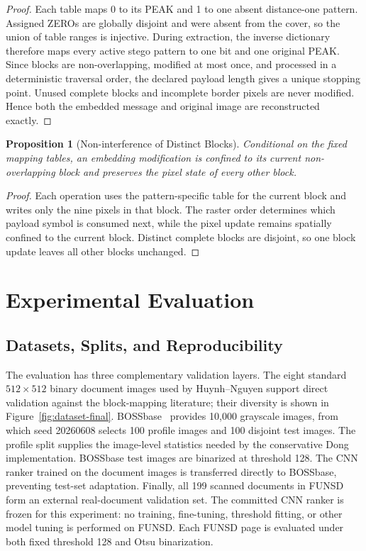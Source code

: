 \documentclass[a4paper,fleqn]{cas-dc}
\newtheorem{proposition}{Proposition}[section]
\newcommand{\RevisionAddBegin}{\begingroup}
\newcommand{\RevisionAddEnd}{\endgroup}
\newcommand{\RevisionAddBegin}{\begingroup\color{revisionblue}}
\newcommand{\RevisionAddEnd}{\endgroup}
\begin{document}
\begin{proof}
Each table maps 0 to its PEAK and 1 to one absent distance-one pattern.
Assigned ZEROs are globally disjoint and were absent from the cover, so the
union of table ranges is injective. During extraction, the inverse dictionary
therefore maps every active stego pattern to one bit and one original PEAK.
Since blocks are non-overlapping, modified at most once, and processed in a
deterministic traversal order, the declared payload length gives a unique
stopping point. Unused complete blocks and incomplete border pixels are never
modified. Hence both the embedded message and original image are reconstructed
exactly.
\end{proof}

\begin{proposition}[Non-interference of Distinct Blocks]
Conditional on the fixed mapping tables, an embedding modification is confined
to its current non-overlapping block and preserves the pixel state of every
other block.
\end{proposition}

\begin{proof}
\RevisionAddBegin
Each operation uses the pattern-specific table for the current block and writes
only the nine pixels in that block. The raster order determines which payload
symbol is consumed next, while the pixel update remains spatially confined to
the current block. Distinct complete blocks are disjoint, so one block update
leaves all other blocks unchanged.
\RevisionAddEnd
\end{proof}

\section{Experimental Evaluation}
\label{sec:experimental}

\subsection{Datasets, Splits, and Reproducibility}

\RevisionAddBegin
The evaluation has three complementary validation layers. The eight standard
$512\times512$ binary document images used by Huynh--Nguyen
\cite{Huynh2025BlockMapping} support direct validation against the block-mapping
literature; their diversity is shown in Figure~\ref{fig:dataset-final}.
BOSSbase~\cite{Bas2011BOSS} provides 10,000 grayscale images, from which seed
20260608 selects 100 profile images and 100 disjoint test images. The profile
split supplies the image-level statistics needed by the conservative Dong
implementation. BOSSbase test images are binarized at threshold 128. The CNN
ranker trained on the document images is transferred directly to BOSSbase,
preventing test-set adaptation. Finally, all 199 scanned documents in FUNSD
form an external real-document validation set. The committed CNN ranker is
frozen for this experiment: no training, fine-tuning, threshold fitting, or
other model tuning is performed on FUNSD. Each FUNSD page is evaluated under
both fixed threshold 128 and Otsu binarization.
\end{document}
